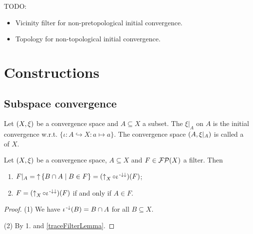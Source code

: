 TODO:
\begin{itemize}
\item Vicinity filter for non-pretopological initial convergence.
\item Topology for non-topological initial convergence.
\end{itemize}


\section{Constructions}
\subsection{Subspace convergence}
\begin{definition}
Let $\sSet{X,\xi}$ be a convergence space and $A\subseteq X$ a subset. The  $\xi|_A$ on $A$ is the initial convergence w.r.t. $\{\iota: A \hookrightarrow X: a\mapsto a\}$. The convergence space $\sSet{A,\xi|_A}$ is called a  of $X$.
\end{definition}

\begin{lemma} \label{setTraceFilterLemma}
Let $\sSet{X,\xi}$ be a convergence space, $A\subseteq X$ and $F\in\operatorname{\mathcal{FP}}(X)$ a filter. Then
\begin{enumerate}
\item $F|_A = \upset \setbuilder{B\cap A}{B\in F} = (\upset_X\circ \iota^{\preimf\imf})(F)$;
\item $F = (\operatorname{\uparrow}_X\circ \iota^{{\text{\hspace{0.15em}-}\downarrow}\downarrow})(F)$ \textup{if and only if} $A\in F$.
\end{enumerate}
\end{lemma}
\begin{proof}
(1) We have $\iota^{{\text{\hspace{0.15em}-}\downarrow}}(B) = B\cap A$ for all $B\subseteq X$.

(2) By 1. and \ref{traceFilterLemma}.
\end{proof}

